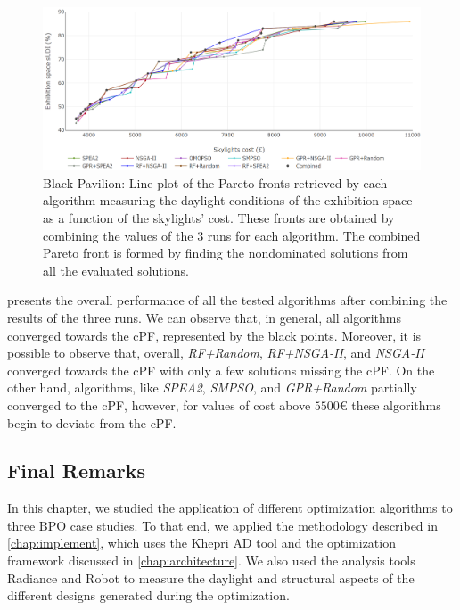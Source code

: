 \begin{figure}[htbp]
	\centering
	\includegraphics[width=\textwidth]{Images/Evaluation/BlackPavilion/All_Algorithms_all_runs-2019-04-16.png}
	\caption[Black Pavilion: Pareto front plot]{Black Pavilion: Line plot of the Pareto fronts retrieved by each algorithm measuring the daylight conditions of the exhibition space as a function of the skylights' cost. These fronts are obtained by combining the values of the $3$ runs for each algorithm. The combined Pareto front is formed by finding the nondominated solutions from all the evaluated solutions.}
	\label{fig:blackpavilionallruns}
\end{figure}

 presents the overall performance of all the tested algorithms after combining the results of the three runs. We can observe that, in general, all algorithms converged towards the \ac{cPF}, represented by the black points. Moreover, it is possible to observe that, overall, \textit{RF+Random}, \textit{RF+NSGA-II}, and \textit{NSGA-II} converged towards the \ac{cPF} with only a few solutions missing the \ac{cPF}. On the other hand, algorithms, like \textit{SPEA2}, \textit{SMPSO}, and \textit{GPR+Random} partially converged to the \ac{cPF}, however, for values of cost above $5500$€ these algorithms begin to deviate from the \ac{cPF}.

\subsection{Final Remarks}
In this chapter, we studied the application of different optimization algorithms to three \ac{BPO} case studies. To that end, we applied the methodology described in \cref{chap:implement}, which uses the Khepri \ac{AD} tool and the optimization framework discussed in \cref{chap:architecture}. We also used the analysis tools Radiance and Robot to measure the daylight and structural aspects of the different designs generated during the optimization.

